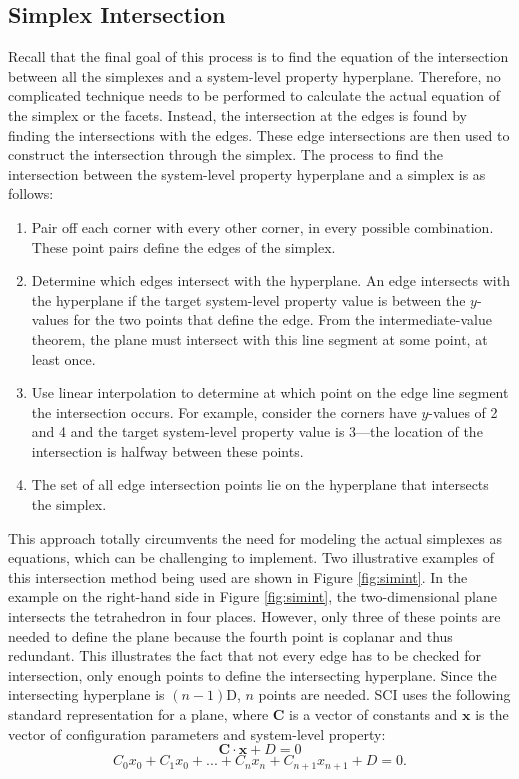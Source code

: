 \subsection{Simplex Intersection}
Recall that the final goal of this process is to find the equation of the intersection between all the simplexes and a system-level property hyperplane.
Therefore, no complicated technique needs to be performed to calculate the actual equation of the simplex or the facets.
Instead, the intersection at the edges is found by finding the intersections with the edges.
These edge intersections are then used to construct the intersection through the simplex.
The process to find the intersection between the system-level property hyperplane and a simplex is as follows:
\begin{enumerate}
   \item Pair off each corner with every other corner, in every possible combination. These point pairs define the edges of the simplex.
   \item Determine which edges intersect with the hyperplane. An edge intersects with the hyperplane if the target system-level property value  is between the $y$-values for the two points that define the edge. From the intermediate-value theorem, the plane must intersect with this line segment at some point, at least once.
   \item Use linear interpolation to determine at which point on the edge line segment the intersection occurs. For example, consider the corners have $y$-values of 2 and 4 and the target system-level property value is 3---the location of the intersection is halfway between these points.
   \item The set of all edge intersection points lie on the hyperplane that intersects the simplex.
\end{enumerate}
This approach totally circumvents the need for modeling the actual simplexes as equations, which can be challenging to implement.
Two illustrative examples of this intersection method being used are shown in Figure \ref{fig:simint}.
In the example on the right-hand side in Figure \ref{fig:simint}, the two-dimensional plane intersects the tetrahedron in four places.
However, only three of these points are needed to define the plane because the fourth point is coplanar and thus redundant.
This illustrates the fact that not every edge has to be checked for intersection, only enough points to define the intersecting hyperplane.
Since the intersecting hyperplane is $(n-1)$D, $n$ points are needed.
SCI uses the following standard representation for a plane, where $\mathbf C$ is a vector of constants and $\mathbf x$ is the vector of configuration parameters and system-level property:
\[\mathbf C \cdot \mathbf x + D = 0\]
\[C_0 x_0 + C_1 x_0 + ... + C_n x_n + C_{n+1} x_{n+1} + D = 0. \]


